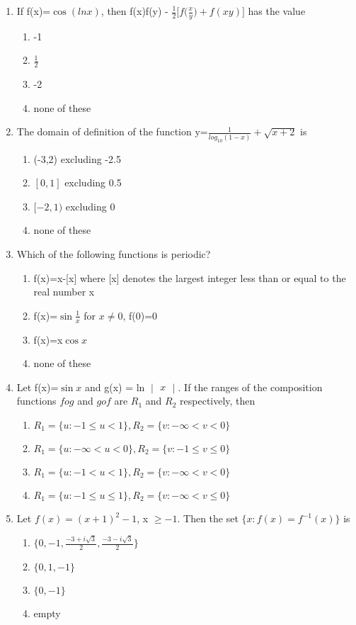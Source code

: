 \begin{enumerate}[label=\arabic*.,ref=\thesubsection.\theenumi]
\item If f(x)=$\cos(ln x)$, then f(x)f(y) - $\frac{1}{2}\Big[f\big(\frac{x}{y}\big)+f(xy)\Big]$  has the value
\begin{enumerate}
\item -1
\item $\frac{1}{2}$
\item -2
\item none of these
\end{enumerate}

\item The domain of definition of the function y=$\frac{1}{log_{10}(1-x)} + \sqrt{x+2}$ is
\begin{enumerate}
\item (-3,2) excluding -2.5
\item $[0,1]$ excluding 0.5
\item $[-2,1)$ excluding 0
\item none of these
\end{enumerate}

\item Which of the following functions is periodic?
\begin{enumerate}
\item f(x)=x-[x] where [x] denotes the largest integer less than or equal to the real number x
\item f(x)=$\sin\frac{1}{x}$ for $x \neq 0$, f(0)=0
\item f(x)=x$\cos x$
\item none of these
\end{enumerate}

\item Let f(x)=$\sin x$ and g(x) = ln $\begin{vmatrix} x \end{vmatrix}$. If the ranges of the composition functions $fog$ and $gof$ are $R_{1}$ and $R_{2}$ respectively, then
\begin{enumerate}
\item $R_1 = \{u: -1 \leq u < 1\}, R_2 = \{v: -\infty < v < 0\}$
\item $R_1 = \{u: -\infty < u < 0\}, R_2 = \{v: -1 \leq v \leq 0\}$
\item $R_1 = \{u: -1 < u < 1\}, R_2 = \{v: -\infty < v < 0\}$
\item $R_1 = \{u: -1 \leq u \leq 1\}, R_2 = \{v: -\infty < v \leq 0\}$
\end{enumerate}

\item Let $f(x)=(x+1)^{2}-1$, x $\geq -1$. Then the set $\{x: f(x)= f^{-1}(x)\}$ is
\begin{enumerate}
\item $\{0,-1, \frac{-3+i\sqrt{3}}{2}, \frac{-3-i\sqrt{3}}{2}\}$
\item $\{0,1,-1\}$
\item $\{0,-1\}$
\item empty
\end{enumerate}


\end{enumerate}
